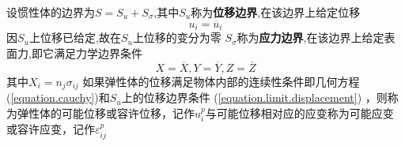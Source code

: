 \documentclass{article}
\begin{document}
设惯性体的边界为$S=S_u+S_{\sigma}$,其中$S_u$称为\textbf{位移边界},在该边界上给定位移
\begin{equation}
u_i=\overline{u}_i
\label{equation.limit.displacement}
\end{equation}
因$S_u$上位移已给定,故在$S_u$上位移的变分为零
$S_\sigma$称为\textbf{应力边界},在该边界上给定表面力,即它满足力学边界条件
\begin{equation}
X=\overline{X},
Y=\overline{Y},
Z=\overline{Z}
\label{equation.limit.contraint}
\end{equation}
其中$X_i=n_j \sigma_{ij}$
如果弹性体的位移满足物体内部的连续性条件即几何方程(\ref{equation.cauchy})和$S_u$上的位移边界条件 (\ref{equation.limit.displacement}) ，则称为弹性体的可能位移或容许位移，记作$u_i^p$与可能位移相对应的应变称为可能应变 或容许应变，记作$\varepsilon_{ij}^p$
\end{document}
